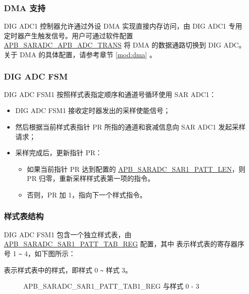\documentclass[main\_\_CN.tex]{subfiles}
\begin{document}
\subsubsection{DMA 支持}

DIG ADC1 控制器允许通过外设 DMA 实现直接内存访问，由 DIG ADC1 专用定时器产生触发信号。用户可通过软件配置 \hyperref[fielddesc:APBSARADCAPBADCTRANS]{APB\_SARADC\_APB\_ADC\_TRANS} 将 DMA 的数据通路切换到 DIG ADC。关于 DMA 的具体配置，请参考章节 \ref{mod:dma} \textit{}。




\subsubsection{DIG ADC FSM}

DIG ADC FSM1 按照样式表指定顺序和通道号循环使用 SAR ADC1：
\begin{itemize}
    \item DIG ADC FSM1 接收定时器发出的采样使能信号；
    \item 然后根据当前样式表指针 PR 所指的通道和衰减信息向 SAR ADC1 发起采样请求；
    \item 采样完成后，更新指针 PR：
    \begin{itemize}
        \item 如果当前指针 PR 达到配置的 \hyperref[fielddesc:APBSARADCSAR1PATTLEN]{APB\_SARADC\_SAR1\_PATT\_LEN}，则 PR 归零，重新采样样式表第一项的指令。
        \item 否则，PR 加 1，指向下一个样式指令。
    \end{itemize}
\end{itemize}

\subsubsection{样式表结构}
DIG ADC FSM1 包含一个独立样式表，由 \hyperref[regdesc:APBSARADCSAR1PATTTAB1REG]{APB\_SARADC\_SAR1\_PATT\_TAB\_REG} 配置，其中  表示样式表的寄存器序号 1 \verb+~+ 4，如下图所示：

%
%
%
%
%
\begin{regdesc}\begin{reglist}
\item [cmd \regindex{n} (\regindex{n} = 0 - 3)] 表示样式表中的样式，即样式 0 \verb+~+ 样式 3。
\end{reglist}\end{regdesc}
\vspace{-2em}
\begin{figure}[H]
    \centering
    \caption{APB\_SARADC\_SAR1\_PATT\_TAB1\_REG 与样式 0 - 3}
    \label{fig:pattern-tab-1}
\end{figure}
\end{document}
